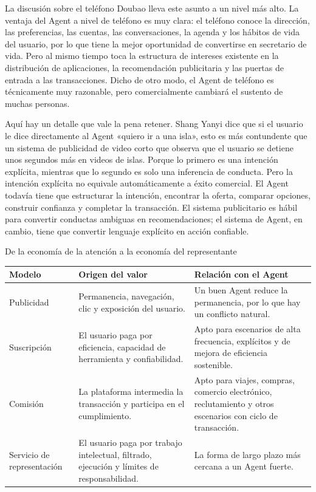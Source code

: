 La discusión sobre el teléfono Doubao lleva este asunto a un nivel más alto. La ventaja del Agent a nivel de teléfono es muy clara: el teléfono conoce la dirección, las preferencias, las cuentas, las conversaciones, la agenda y los hábitos de vida del usuario, por lo que tiene la mejor oportunidad de convertirse en secretario de vida. Pero al mismo tiempo toca la estructura de intereses existente en la distribución de aplicaciones, la recomendación publicitaria y las puertas de entrada a las transacciones. Dicho de otro modo, el Agent de teléfono es técnicamente muy razonable, pero comercialmente cambiará el sustento de muchas personas.

Aquí hay un detalle que vale la pena retener. Shang Yanyi dice que si el usuario le dice directamente al Agent «quiero ir a una isla», esto es más contundente que un sistema de publicidad de video corto que observa que el usuario se detiene unos segundos más en videos de islas. Porque lo primero es una intención explícita, mientras que lo segundo es solo una inferencia de conducta. Pero la intención explícita no equivale automáticamente a éxito comercial. El Agent todavía tiene que estructurar la intención, encontrar la oferta, comparar opciones, construir confianza y completar la transacción. El sistema publicitario es hábil para convertir conductas ambiguas en recomendaciones; el sistema de Agent, en cambio, tiene que convertir lenguaje explícito en acción confiable.

\begin{knowledgebox}{De la economía de la atención a la economía del representante}
\begin{tabularx}{\textwidth}{>{\raggedright\arraybackslash}p{} Y Y}
\toprule
Modelo & Origen del valor & Relación con el Agent \\
\midrule
Publicidad & Permanencia, navegación, clic y exposición del usuario. & Un buen Agent reduce la permanencia, por lo que hay un conflicto natural. \\
Suscripción & El usuario paga por eficiencia, capacidad de herramienta y confiabilidad. & Apto para escenarios de alta frecuencia, explícitos y de mejora de eficiencia sostenible. \\
Comisión & La plataforma intermedia la transacción y participa en el cumplimiento. & Apto para viajes, compras, comercio electrónico, reclutamiento y otros escenarios con ciclo de transacción. \\
Servicio de representación & El usuario paga por trabajo intelectual, filtrado, ejecución y límites de responsabilidad. & La forma de largo plazo más cercana a un Agent fuerte. \\
\bottomrule
\end{tabularx}
\end{knowledgebox}

